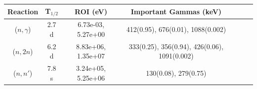 \begin{figure}[!ht]
   \centering
   \quad
   \\ 
   \quad 
   \\ 

\end{figure}

\begin{table}[h]
\centering
\begin{tabular}{ |c|c|c|c|c|c|c| }
 \hline
 Reaction & T$_{1/2}$ & ROI (eV) & Important Gammas (keV) \\
 \hline 
 ($n,\gamma$) &  2.7 d & 6.73e-03, 5.27e+00 & 412(0.95), 676(0.01), 1088(0.002) \\ 
\hline
 ($n,2n$) &  6.2 d & 8.83e+06, 1.35e+07 & 333(0.25), 356(0.94), 426(0.06), 1091(0.002) \\ 
\hline
 ($n,n'$) &  7.8 s & 3.24e+05, 5.25e+06 & 130(0.08), 279(0.75) \\ 
\hline
\end{tabular}
\end{table}
